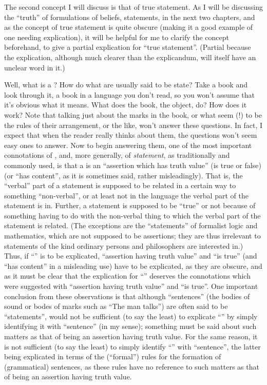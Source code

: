 The second concept I will discuss is that of true statement. As I will be 
discussing the \enquote{truth} of formulations of beliefs, statements, in the next two 
chapters, and as the concept of true statement is quite obscure (making it a 
good example of one needing explication), it will be helpful for me to clarify 
the concept beforehand, to give a partial explication for \enquote{true statement}. 
(Partial because the explication, although much clearer than the 
explicandum, will itself have an unclear word in it.) 

Well, what is a ? How do what are usually said to be 
 state? Take a book and look through it, a book in a language 
you don't read, so you won't assume that it's obvious what it means. What 
does the book, the object, do? How does it work? Note that talking just 
about the marks in the book, or what seem (!) to be the rules of their 
arrangement, or the like, won't answer these questions. In fact, I expect that 
when the reader really thinks about them, the questions won't seem easy 
ones to answer. Now to begin answering them, one of the most important 
connotations of , and, more generally, of \emph{statement}, as 
traditionally and commonly used, is that a  is an \enquote{assertion 
which has truth value} (is true or false) (or \enquote{has content}, as it is sometimes 
said, rather misleadingly). That is, the \enquote{verbal} part of a statement is 
supposed to be related in a certain way to something \enquote{non-verbal}, or at 
least not in the language the verbal part of the statement is in. Further, a 
statement is supposed to be \enquote{true} or not because of something having to do 
with the non-verbal thing to which the verbal part of the statement is 
related. (The exceptions are the \enquote{statements} of formalist logic and 
mathematics, which are not supposed to be assertions; they are thus 
irrelevant to statements of the kind ordinary persons and philosophers are 
interested in.) Thus, if \enquote{} is to be explicated, \enquote{assertion having 
truth value} and \enquote{is true} (and \enquote{has content} in a misleading use) have to be 
explicated, as they are obscure, and as it must be clear that the explication 
for \enquote{} deserves the connotations which were suggested with 
\enquote{assertion having truth value} and \enquote{is true}. One important conclusion from 
these observations is that although \enquote{sentences} (the bodies of sound or 
bodes of marks such as \enquote{The man talks}) are often said to be \enquote{statements}, 
would not be sufficient (to say the least) to explicate \enquote{} by simply 
identifying it with \enquote{sentence} (in my sense); something must be said about 
such matters as that of being an assertion having truth value. For the same 
reason, it is not sufficient (to say the least) to simply identify \enquote{}
with \enquote{sentence}, the latter being explicated in terms of the (\enquote{formal}) rules 
for the formation of (grammatical) sentences, as these rules have no 
reference to such matters as that of being an assertion having truth value. 

